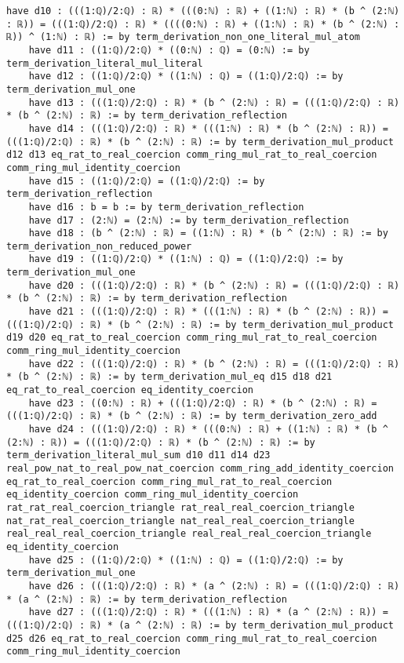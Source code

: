 \documentclass{article}
\begin{document}
\begin{tcolorbox}[colback=white!10, width=\linewidth]
\begin{lstlisting}[language=Lean4]
    have d10 : (((1:ℚ)/2:ℚ) : ℝ) * (((0:ℕ) : ℝ) + ((1:ℕ) : ℝ) * (b ^ (2:ℕ) : ℝ)) = (((1:ℚ)/2:ℚ) : ℝ) * ((((0:ℕ) : ℝ) + ((1:ℕ) : ℝ) * (b ^ (2:ℕ) : ℝ)) ^ (1:ℕ) : ℝ) := by term_derivation_non_one_literal_mul_atom
    have d11 : ((1:ℚ)/2:ℚ) * ((0:ℕ) : ℚ) = (0:ℕ) := by term_derivation_literal_mul_literal
    have d12 : ((1:ℚ)/2:ℚ) * ((1:ℕ) : ℚ) = ((1:ℚ)/2:ℚ) := by term_derivation_mul_one
    have d13 : (((1:ℚ)/2:ℚ) : ℝ) * (b ^ (2:ℕ) : ℝ) = (((1:ℚ)/2:ℚ) : ℝ) * (b ^ (2:ℕ) : ℝ) := by term_derivation_reflection
    have d14 : (((1:ℚ)/2:ℚ) : ℝ) * (((1:ℕ) : ℝ) * (b ^ (2:ℕ) : ℝ)) = (((1:ℚ)/2:ℚ) : ℝ) * (b ^ (2:ℕ) : ℝ) := by term_derivation_mul_product d12 d13 eq_rat_to_real_coercion comm_ring_mul_rat_to_real_coercion comm_ring_mul_identity_coercion
    have d15 : ((1:ℚ)/2:ℚ) = ((1:ℚ)/2:ℚ) := by term_derivation_reflection
    have d16 : b = b := by term_derivation_reflection
    have d17 : (2:ℕ) = (2:ℕ) := by term_derivation_reflection
    have d18 : (b ^ (2:ℕ) : ℝ) = ((1:ℕ) : ℝ) * (b ^ (2:ℕ) : ℝ) := by term_derivation_non_reduced_power
    have d19 : ((1:ℚ)/2:ℚ) * ((1:ℕ) : ℚ) = ((1:ℚ)/2:ℚ) := by term_derivation_mul_one
    have d20 : (((1:ℚ)/2:ℚ) : ℝ) * (b ^ (2:ℕ) : ℝ) = (((1:ℚ)/2:ℚ) : ℝ) * (b ^ (2:ℕ) : ℝ) := by term_derivation_reflection
    have d21 : (((1:ℚ)/2:ℚ) : ℝ) * (((1:ℕ) : ℝ) * (b ^ (2:ℕ) : ℝ)) = (((1:ℚ)/2:ℚ) : ℝ) * (b ^ (2:ℕ) : ℝ) := by term_derivation_mul_product d19 d20 eq_rat_to_real_coercion comm_ring_mul_rat_to_real_coercion comm_ring_mul_identity_coercion
    have d22 : (((1:ℚ)/2:ℚ) : ℝ) * (b ^ (2:ℕ) : ℝ) = (((1:ℚ)/2:ℚ) : ℝ) * (b ^ (2:ℕ) : ℝ) := by term_derivation_mul_eq d15 d18 d21 eq_rat_to_real_coercion eq_identity_coercion
    have d23 : ((0:ℕ) : ℝ) + (((1:ℚ)/2:ℚ) : ℝ) * (b ^ (2:ℕ) : ℝ) = (((1:ℚ)/2:ℚ) : ℝ) * (b ^ (2:ℕ) : ℝ) := by term_derivation_zero_add
    have d24 : (((1:ℚ)/2:ℚ) : ℝ) * (((0:ℕ) : ℝ) + ((1:ℕ) : ℝ) * (b ^ (2:ℕ) : ℝ)) = (((1:ℚ)/2:ℚ) : ℝ) * (b ^ (2:ℕ) : ℝ) := by term_derivation_literal_mul_sum d10 d11 d14 d23 real_pow_nat_to_real_pow_nat_coercion comm_ring_add_identity_coercion eq_rat_to_real_coercion comm_ring_mul_rat_to_real_coercion eq_identity_coercion comm_ring_mul_identity_coercion rat_rat_real_coercion_triangle rat_real_real_coercion_triangle nat_rat_real_coercion_triangle nat_real_real_coercion_triangle real_real_real_coercion_triangle real_real_real_coercion_triangle eq_identity_coercion
    have d25 : ((1:ℚ)/2:ℚ) * ((1:ℕ) : ℚ) = ((1:ℚ)/2:ℚ) := by term_derivation_mul_one
    have d26 : (((1:ℚ)/2:ℚ) : ℝ) * (a ^ (2:ℕ) : ℝ) = (((1:ℚ)/2:ℚ) : ℝ) * (a ^ (2:ℕ) : ℝ) := by term_derivation_reflection
    have d27 : (((1:ℚ)/2:ℚ) : ℝ) * (((1:ℕ) : ℝ) * (a ^ (2:ℕ) : ℝ)) = (((1:ℚ)/2:ℚ) : ℝ) * (a ^ (2:ℕ) : ℝ) := by term_derivation_mul_product d25 d26 eq_rat_to_real_coercion comm_ring_mul_rat_to_real_coercion comm_ring_mul_identity_coercion

\end{lstlisting}
\end{tcolorbox}
\end{document}
